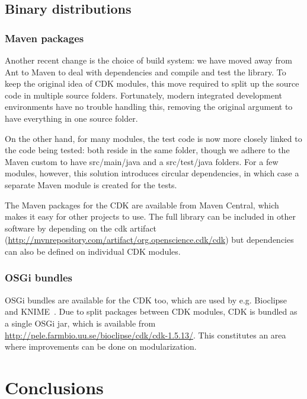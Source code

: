 \documentclass[10pt]{bmcart}
\begin{document}
\subsection*{Binary distributions}

\subsubsection*{Maven packages}

Another recent change is the choice of build system: we have moved away from
Ant to Maven to deal with dependencies and compile and test the library.
To keep the original idea of CDK modules, this move required to split up the
source code in multiple source folders. Fortunately, modern integrated
development environments have no trouble handling this, removing the original
argument to have everything in one source folder.

On the other hand, for many modules, the test code is now more closely
linked to the code being tested: both reside in the same folder, though we
adhere to the Maven custom to have src/main/java and a src/test/java folders.
For a few modules, however, this solution introduces circular dependencies, in
which case a separate Maven module is created for the tests.

The Maven packages for the CDK are available from Maven Central, which makes it
easy for other projects to use. The full library can be included in other
software by depending on the cdk artifact (\url{http://mvnrepository.com/artifact/org.openscience.cdk/cdk})
but dependencies can also be defined on individual CDK modules.

\subsubsection*{OSGi bundles}

OSGi bundles are available for the CDK too, which are used by e.g. Bioclipse~\cite{spjuth2007bioclipse,spjuth2009bioclipse} and KNIME~\cite{Beisken2013}. Due to split packages between CDK modules, CDK is bundled as a single OSGi jar, which is available from \url{http://pele.farmbio.uu.se/bioclipse/cdk/cdk-1.5.13/}. This constitutes an area where improvements can be done on modularization.



\section*{Conclusions}
\end{document}
